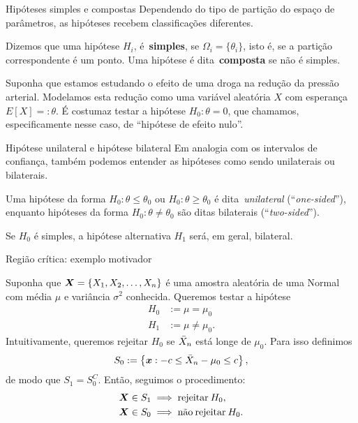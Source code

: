 \begin{frame}{Hipóteses simples e compostas}
 Dependendo do tipo de partição do espaço de parâmetros, as hipóteses recebem classificações diferentes.
 \begin{defn}
  Dizemos que uma hipótese $H_i$, é~\textbf{simples}, se $\Omega_i = \{ \theta_i \}$, isto é, se a partição correspondente é um ponto. 
  Uma hipótese é dita~\textbf{composta} se não é simples.
 \end{defn}
 
 \begin{exemplo}
  Suponha que estamos estudando o efeito de uma droga na redução da pressão arterial.
  Modelamos esta redução como uma variável aleatória $X$ com esperança $E[X] =: \theta$.
  É costumaz testar a hipótese $H_0 : \theta = 0$, que chamamos, especificamente nesse caso, de ``hipótese de efeito nulo''.
 \end{exemplo}
\end{frame}

\begin{frame}{Hipótese unilateral e hipótese bilateral}
 Em analogia com os intervalos de confiança, também podemos entender as hipóteses como sendo unilaterais ou bilaterais.
 \begin{defn}
  Uma hipótese da forma $H_0 : \theta \leq \theta_0$ ou $H_0 : \theta \geq \theta_0$ é dita~\textit{unilateral} (``\textit{one-sided}''), enquanto hipóteses da forma $H_0 : \theta \neq \theta_0$ são ditas bilaterais (``\textit{two-sided}'').
 \end{defn}
 
 \begin{obs}
 Se $H_0$ é simples, a hipótese alternativa $H_1$ será, em geral, bilateral.  
 \end{obs}
\end{frame}

\begin{frame}{Região crítica: exemplo motivador}
 \begin{exemplo}
  Suponha que $\boldsymbol{X} = \{ X_1, X_2, \ldots, X_n \}$ é uma amostra aleatória de uma Normal com média $\mu$ e variância $\sigma^2$ conhecida.
  Queremos testar a hipótese
  \begin{align*}
   H_0 &:= \mu = \mu_0\\
   H_1 &:= \mu \neq \mu_0.
  \end{align*}
  Intuitivamente, queremos rejeitar $H_0$ se $\bar{X}_n$ está longe de $\mu_0$.
  Para isso definimos
  \[ S_0 := \left\{ \boldsymbol{x}: -c \leq \bar{X}_n - \mu_0 \leq c \right\}, \]
  de modo que $S_1 = S_0^C$. 
  Então, seguimos o procedimento:
      \begin{align*}
   \boldsymbol{X} \in S_1 &\implies \text{rejeitar}\: H_0,\\
   \boldsymbol{X} \in S_0 &\implies \text{não\:rejeitar}\: H_0.\\
  \end{align*}
 \end{exemplo}
\end{frame}

